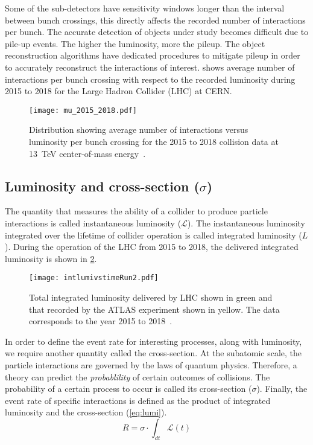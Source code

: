 Some of the sub-detectors have sensitivity windows longer than the interval between
bunch crossings, this directly affects the recorded number of interactions per bunch. The accurate
detection of objects under study becomes difficult due to pile-up events. The higher the 
luminosity, more the pileup. The object reconstruction algorithms have dedicated procedures 
to mitigate pileup in order to accurately reconstruct the interactions of interest. 
shows average number of interactions per bunch crossing with respect to the recorded luminosity
during 2015 to 2018 for the Large Hadron Collider (LHC) at CERN.

\begin{figure}[htbp]
    \centering
    \texttt{[image: mu\_2015\_2018.pdf]}
    \caption{Distribution showing average number of interactions versus luminosity per bunch crossing for the
    2015 to 2018 collision data at \SI{13}{\TeV} center-of-mass energy~\cite{twikipileup}.}%
    \label{fig:pileup}
\end{figure}

\subsection*{Luminosity and cross-section ($\sigma$)}
The quantity that measures the ability of a collider to produce particle interactions is called
instantaneous luminosity ($\mathcal{L}$). The instantaneous luminosity integrated over the lifetime
of collider operation is called integrated luminosity ($L$). During the operation of the LHC
from 2015 to 2018, the delivered integrated luminosity is shown in \cref{fig:lumi}.

\begin{figure}[htbp]
    \centering
    \texttt{[image: intlumivstimeRun2.pdf]}
    \caption{Total integrated luminosity delivered by LHC shown in green and that recorded by
    the ATLAS experiment shown in yellow. The data corresponds to the year 2015 to 2018~\cite{twikilumi}.}%
    \label{fig:lumi}
\end{figure}

In order to define the event rate for interesting processes, along with luminosity, we require
another quantity called the cross-section. At the subatomic scale, the particle interactions 
are governed by the laws of quantum physics. Therefore, a theory can predict 
the \textit{probablility} of certain outcomes of collisions. The probability of a certain
process to occur is called its cross-section ($\sigma$). Finally, the event rate of
specific interactions is defined as the product of integrated luminosity and the cross-section (\cref{eq:lumi}).
\begin{equation}
    R = \sigma \cdot \int_{dt} \mathcal{L}(t)
    \label{eq:lumi}
\end{equation}

